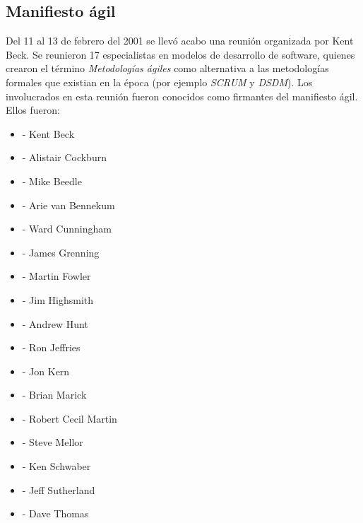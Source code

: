 \documentclass[12pt,a4paper]{article}
\begin{document}
	\subsection*{Manifiesto \'agil}
	Del 11 al 13 de febrero del  2001 se llev\'o acabo una reuni\'on organizada por Kent Beck. Se reunieron 17 especialistas en modelos de desarrollo de software, quienes crearon el t\'ermino {\itshape Metodolog\'ias \'agiles} como alternativa a las metodolog\'ias formales que existian en la \'epoca (por ejemplo {\itshape SCRUM} y {\itshape DSDM}).
	Los involucrados en esta reuni\'on fueron conocidos como firmantes del manifiesto \'agil. Ellos fueron:
	\begin{itemize}	
		\item- Kent Beck
		\item- Alistair Cockburn
		\item- Mike Beedle
		\item- Arie van Bennekum
		\item- Ward Cunningham
		\item- James Grenning
		\item- Martin Fowler
		\item- Jim Highsmith
		\item- Andrew Hunt
		\item- Ron Jeffries
		\item- Jon Kern
		\item- Brian Marick
		\item- Robert Cecil Martin
		\item- Steve Mellor
		\item- Ken Schwaber
		\item- Jeff Sutherland
		\item- Dave Thomas
		\\
	\end{itemize}		
\end{document}
